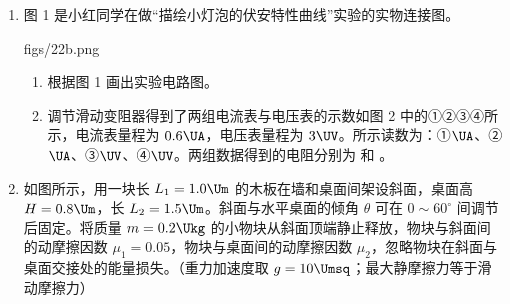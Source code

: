\documentclass[\gkver]{gaokaozhenti}
\begin{document}
\begin{enumerate}
{	（2）纸带①中前第 1、2 点与第 2、3 点的位移差为连续相等时间内位移差 $\Delta x_{1}=(32.40-30.70)-(30.70-29.10)=0.1\Ucm$；纸带②中前第 1、2 点与第 2、3 点的位移差为连续相等时间内位移差 $\Delta x_{2}=(31.65-29.00)-(29.00-27.40)=0.05\Ucm$；由匀变速直线运动 $\Delta x=aT^{2}$，可知纸带①加速度大，为 $a=\Delta x/T^{2}=2.5\Umsq$。
}

\item
图 1 是小红同学在做“描绘小灯泡的伏安特性曲线”实验的实物连接图。

{figs/22b.png}

\begin{enumerate}
	\item
	根据图 1 画出实验电路图。

	\item
	调节滑动变阻器得到了两组电流表与电压表的示数如图 2 中的①②③④所示，电流表量程为 $0.6\UA$，电压表量程为 $3\UV$。所示读数为：①$\UA$、②$\UA$、③$\UV$、④$\UV$。两组数据得到的电阻分别为  和 。
\end{enumerate}


\item
如图所示，用一块长 $L_{1}=1.0\Um$ 的木板在墙和桌面间架设斜面，桌面高 $H=0.8\Um$，长 $L_{2}=1.5\Um$。斜面与水平桌面的倾角 $\theta$ 可在 $0\sim60^\circ$ 间调节后固定。将质量 $m=0.2\Ukg$ 的小物块从斜面顶端静止释放，物块与斜面间的动摩擦因数 $\mu_{1}=0.05$，物块与桌面间的动摩擦因数 $\mu_{2}$，忽略物块在斜面与桌面交接处的能量损失。（重力加速度取 $g=10\Umsq$；最大静摩擦力等于滑动摩擦力）


\end{enumerate}
\end{document}
